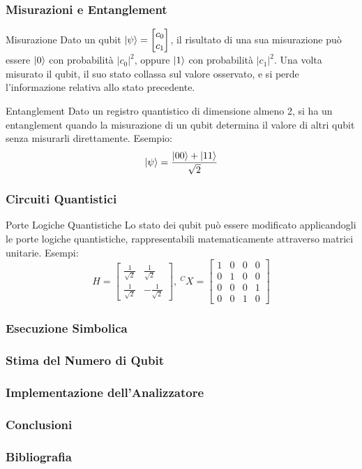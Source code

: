 \documentclass{beamer}
\begin{document}
\begin{frame}
    \frametitle{Misurazioni e Entanglement}
    \begin{block}{Misurazione}
        Dato un qubit $\ket{\psi}=\begin{bmatrix}c_0\\c_1\end{bmatrix}$, il risultato di una sua misurazione può essere $\ket{0}$ con probabilità $|c_0|^2$, oppure $\ket{1}$ con probabilità $|c_1|^2$. Una volta misurato il qubit, il suo stato collassa sul valore osservato, e si perde l'informazione relativa allo stato precedente.
    \end{block}
    \begin{block}{Entanglement}
        Dato un registro quantistico di dimensione almeno 2, si ha un entanglement quando la misurazione di un qubit determina il valore di altri qubit senza misurarli direttamente. Esempio:
        \begin{equation*}
            \ket{\psi}=\frac{\ket{00}+\ket{11}}{\sqrt{2}}
        \end{equation*}
    \end{block}

\end{frame}

\begin{frame}
    \frametitle{Circuiti Quantistici}
    \begin{block}{Porte Logiche Quantistiche}
        Lo stato dei qubit può essere modificato applicandogli le porte logiche quantistiche, rappresentabili matematicamente attraverso matrici unitarie. Esempi:
        \begin{equation*}
            H=\begin{bmatrix} \frac{1}{\sqrt{2}} & \frac{1}{\sqrt{2}}\\
                \frac{1}{\sqrt{2}} & -\frac{1}{\sqrt{2}}\end{bmatrix},\ ^CX=\begin{bmatrix}1&0&0&0\\0&1&0&0\\0&0&0&1\\0&0&1&0\end{bmatrix}
        \end{equation*}
    \end{block}
\end{frame}

\begin{frame}
    \frametitle{Esecuzione Simbolica}
\end{frame}

\begin{frame}
    \frametitle{Stima del Numero di Qubit}
\end{frame}

\begin{frame}
    \frametitle{Implementazione dell'Analizzatore}
\end{frame}

\begin{frame}
    \frametitle{Conclusioni}
\end{frame}

\begin{frame}
    \frametitle{Bibliografia}
    \printbibliography
\end{frame}
\end{document}
